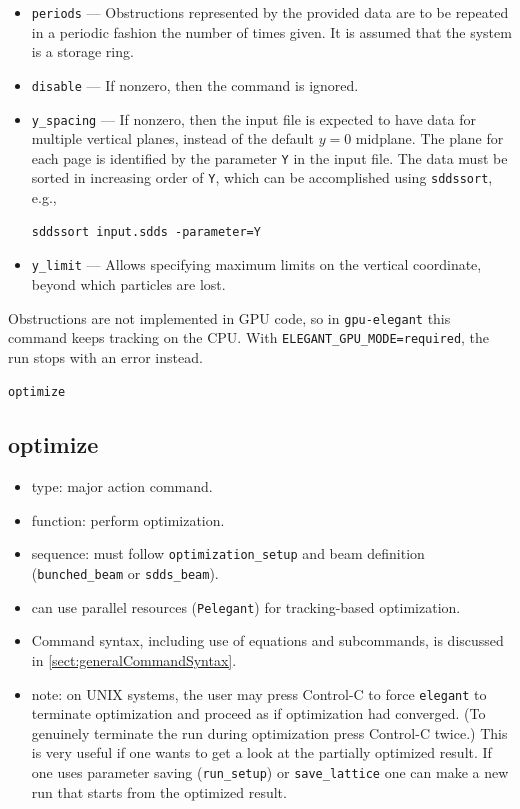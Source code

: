 \documentclass[11pt]{article}
\begin{document}
\begin{itemize}
\item \verb|periods| --- Obstructions represented by the provided data are to be repeated in a 
  periodic fashion the number of times given. It is assumed that the system is a storage ring.
\item \verb|disable| --- If nonzero, then the command is ignored.
\item \verb|y_spacing| --- If nonzero, then the input file is expected to have data for multiple vertical planes,
  instead of the default $y=0$ midplane. The plane for each page is identified by the parameter \verb|Y| in the
  input file. The data must be sorted in increasing order of \verb|Y|, which can be accomplished using \verb|sddssort|, e.g.,
\begin{verbatim}
sddssort input.sdds -parameter=Y
\end{verbatim}

\item \verb|y_limit| --- Allows specifying maximum limits on the vertical coordinate, beyond which particles are lost.
\end{itemize}

Obstructions are not implemented in GPU code, so in \verb|gpu-elegant| this command keeps tracking on the CPU.
With \verb|ELEGANT_GPU_MODE=required|, the run stops with an error instead.

\newpage
\begin{center}{\Large\verb|optimize|}\end{center}
\subsection{optimize \label{subsec:optimize}}

\begin{itemize}
\item type: major action command.
\item function: perform optimization.
\item sequence: must follow \verb|optimization_setup| and beam definition (\verb|bunched_beam| or \verb|sdds_beam|).
\item can use parallel resources (\verb|Pelegant|) for tracking-based optimization.
\item Command syntax, including use of equations and subcommands, is discussed in \ref{sect:generalCommandSyntax}.
\item note: on UNIX systems, the user may press Control-C to force
\verb|elegant| to terminate optimization and proceed as if
optimization had converged.  (To genuinely terminate the run during
optimization press Control-C twice.) This is very useful if one wants
to get a look at the partially optimized result.  If one uses parameter
saving (\verb|run_setup|) or \verb|save_lattice| one can make a new
run that starts from the optimized result.
\end{itemize}
\end{document}
